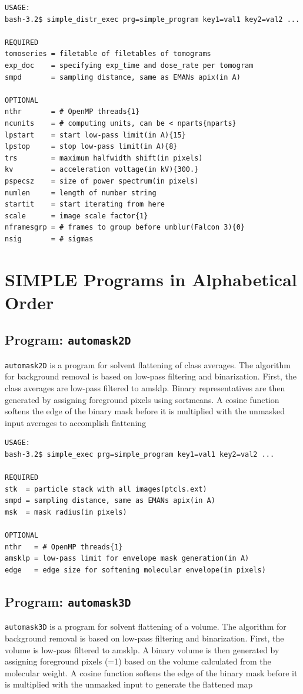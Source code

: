 \documentclass[a4paper,11pt]{article}
\newcommand{\prgname}[1]{\textcolor{NavyBlue}{\texttt{#1}}}
\begin{document}
\begin{verbatim}
USAGE:
bash-3.2$ simple_distr_exec prg=simple_program key1=val1 key2=val2 ...

REQUIRED
tomoseries = filetable of filetables of tomograms
exp_doc    = specifying exp_time and dose_rate per tomogram
smpd       = sampling distance, same as EMANs apix(in A)

OPTIONAL
nthr       = # OpenMP threads{1}
ncunits    = # computing units, can be < nparts{nparts}
lpstart    = start low-pass limit(in A){15}
lpstop     = stop low-pass limit(in A){8}
trs        = maximum halfwidth shift(in pixels)
kv         = acceleration voltage(in kV){300.}
pspecsz    = size of power spectrum(in pixels)
numlen     = length of number string
startit    = start iterating from here
scale      = image scale factor{1}
nframesgrp = # frames to group before unblur(Falcon 3){0}
nsig       = # sigmas
\end{verbatim}

\section{SIMPLE Programs in Alphabetical Order}
\subsection{Program: \prgname{automask2D}}
\label{automask2D}
\prgname{automask2D} is a program for solvent flattening of class averages. The algorithm for background removal is based on low-pass filtering and binarization. First, the class averages are low-pass filtered to amsklp. Binary representatives are then generated by assigning foreground pixels using sortmeans. A cosine function softens the edge of the binary mask before it is  multiplied with the unmasked input averages to accomplish flattening

\begin{verbatim}
USAGE:
bash-3.2$ simple_exec prg=simple_program key1=val1 key2=val2 ...

REQUIRED
stk  = particle stack with all images(ptcls.ext)
smpd = sampling distance, same as EMANs apix(in A)
msk  = mask radius(in pixels)

OPTIONAL
nthr   = # OpenMP threads{1}
amsklp = low-pass limit for envelope mask generation(in A)
edge   = edge size for softening molecular envelope(in pixels)
\end{verbatim}

\subsection{Program: \prgname{automask3D}}
\label{automask3D}
\prgname{automask3D} is a program for solvent flattening of a volume. The algorithm for background removal is based on low-pass filtering and binarization. First, the volume is low-pass filtered to amsklp. A binary volume is then generated by assigning foreground pixels (=1) based on the volume calculated from the molecular weight. A cosine function softens the edge of the binary mask before it is  multiplied with the unmasked input to generate the flattened map 
\end{document}
